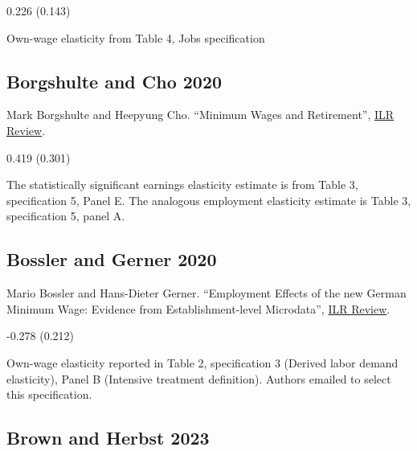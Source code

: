 \vspace{0.7em}

 0.226 (0.143)

\vspace{0.7em}

 Own-wage elasticity from Table 4, Jobs specification

\subsection*{Borgshulte and Cho 2020}
\vspace{-0.7em}

\noindent Mark Borgshulte and Heepyung Cho. ``Minimum Wages and Retirement'', \href{https://doi.org/10.1177/0019793919845861}{ILR Review}.

\vspace{0.7em}

 0.419 (0.301)

\vspace{0.7em}

 The statistically significant earnings elasticity estimate is from Table 3, specification 5, Panel E. The analogous employment elasticity estimate is Table 3, specification 5, panel A.

\subsection*{Bossler and Gerner 2020}
\vspace{-0.7em}

\noindent Mario Bossler and Hans-Dieter Gerner. ``Employment Effects of the new German Minimum Wage: Evidence from Establishment-level Microdata'', \href{https://doi.org/10.1177/0019793919889635}{ILR Review}.

\vspace{0.7em}

 -0.278 (0.212)

\vspace{0.7em}

 Own-wage elasticity reported in Table 2, specification 3 (Derived labor demand elasticity), Panel B (Intensive treatment definition). Authors emailed to select this specification.

\subsection*{Brown and Herbst 2023}
\vspace{-0.7em}

